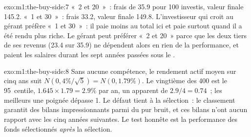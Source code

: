 \begin{solution}{exo:m1:the-buy-side:7}
«~2 et 20~»~: frais de 35.9 pour 100 investis, valeur finale 145.2. «~1 et 30~»~:
frais 33.2, valeur finale 149.8. L'investisseur qui croit au gérant
préfère «~1 et 30~»~: il paie moins au total ici et paie surtout quand il a été
rendu plus riche. Le gérant peut préférer «~2 et 20~» parce que les deux tiers
de ses revenus (23.4 sur 35.9) ne dépendent alors en rien de la performance, et
paient les salaires durant les sept années passées sous le .
\end{solution}

\begin{solution}{exo:m1:the-buy-side:8}
Sans aucune compétence, le rendement actif moyen sur cinq ans suit $N(0, 4\%/\sqrt5) = N(0,
1.79\%)$. Le vingtième des 400 est le 95~centile, $1.645 \times 1.79 =
2.9\%$ par an, un  apparent de $2.9/4 = 0.74$~; les meilleurs
une poignée dépasse 1. Le défaut tient à la sélection~: le classement garantit des
bilans impressionnants parmi du pur bruit, et ces bilans n'ont aucun rapport avec les cinq
années suivantes. Le test honnête est la performance des fonds sélectionnés
\emph{après} la sélection.
\end{solution}

